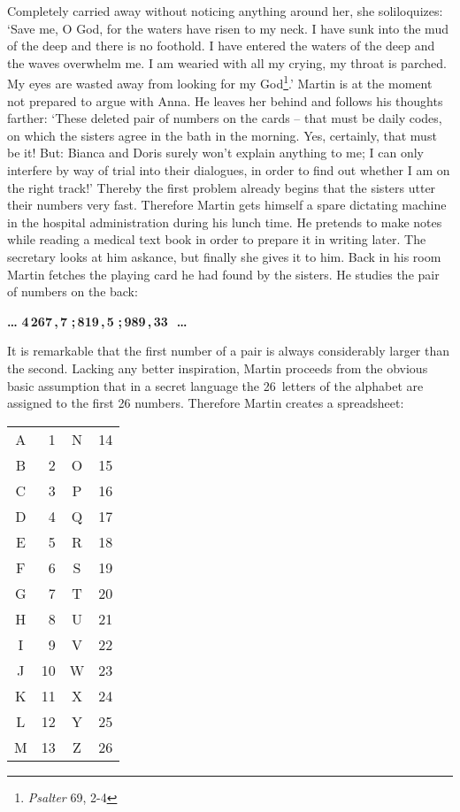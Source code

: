 Completely carried away without noticing anything around her, she soliloquizes: 
`Save me, O God, for the waters have risen to my neck.
I have sunk into the mud of the deep and there is no foothold.
I have entered the waters of the deep and the waves overwhelm me.
I am wearied with all my crying, my throat is parched. My eyes are wasted away from 
looking for my God\footnote{{\em Psalter\/} 69, 2-4}.' 
Martin is at the moment not prepared to argue with Anna.
He leaves her behind and follows his thoughts farther: `These deleted pair of 
numbers on the cards -- that must be daily codes, on which the sisters agree in the
bath in the morning. 
Yes, certainly, that must be it! 
But: Bianca and Doris surely won't explain anything to me; I can only interfere by 
way of trial into their dialogues, in order to find out whether I am on the right 
track!' 
Thereby the first problem already begins that the sisters utter their numbers very 
fast. Therefore Martin gets himself a spare dictating machine in the hospital 
administration during his lunch time. 
He pretends to make notes while reading a medical text book in order to prepare it 
in writing later. 
The secretary looks at him askance, but finally she gives it to him. 
Back in his room Martin fetches the playing card he had found by the sisters. He 
studies the pair of numbers on the back: 
\begin{center}
{\bf \dots \,\,4\,267\,,\,7\,\,;\,819\,,\,5\,\,;\,989\,,\,33
\,\,\dots}
\end{center}
It is remarkable that the first number of a pair is always considerably larger than 
the second. 
Lacking any better inspiration, Martin proceeds from the obvious basic assumption 
that in a secret language the 26~letters of the alphabet are assigned to the first 
26 numbers. 
Therefore Martin creates a spreadsheet: 
\begin{center}
\begin{tabular}{c|r||c|r}
A & 1 & N & 14 \\
B & 2 & O & 15 \\
C & 3 & P & 16 \\
D & 4 & Q & 17 \\
E & 5 & R & 18 \\
F & 6 & S & 19 \\
G & 7 & T & 20 \\
H & 8 & U & 21 \\
I & 9 & V & 22 \\
J & 10 & W & 23 \\
K & 11 & X & 24 \\
L & 12 & Y & 25 \\
M & 13 & Z & 26
\end{tabular}
\end{center}
